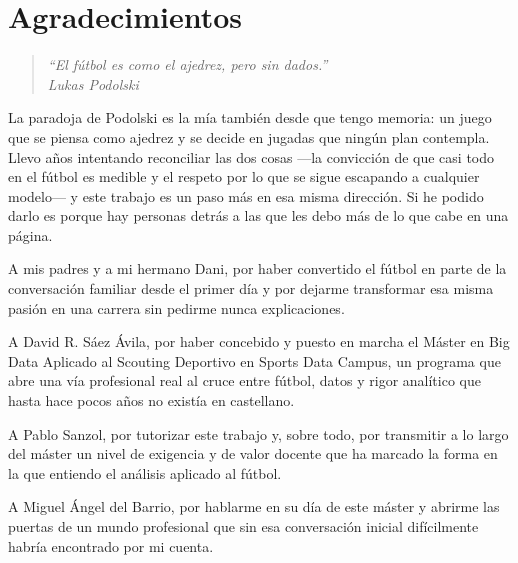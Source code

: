 \chapter*{Agradecimientos}

\begin{quote}
\itshape ``El fútbol es como el ajedrez, pero sin dados.''\\
\normalfont\textemdash{} Lukas Podolski
\end{quote}

\noindent
La paradoja de Podolski es la mía también desde que tengo memoria: un
juego que se piensa como ajedrez y se decide en jugadas que ningún
plan contempla. Llevo años intentando reconciliar las dos cosas
---la convicción de que casi todo en el fútbol es medible y el
respeto por lo que se sigue escapando a cualquier modelo--- y este
trabajo es un paso más en esa misma dirección. Si he podido darlo es
porque hay personas detrás a las que les debo más de lo que cabe en
una página.

A mis padres y a mi hermano Dani, por haber convertido el fútbol en
parte de la conversación familiar desde el primer día y por dejarme
transformar esa misma pasión en una carrera sin pedirme nunca
explicaciones.

A David R. Sáez Ávila, por haber concebido y puesto en marcha el
Máster en Big Data Aplicado al Scouting Deportivo en Sports Data
Campus, un programa que abre una vía profesional real al cruce entre
fútbol, datos y rigor analítico que hasta hace pocos años no existía
en castellano.

A Pablo Sanzol, por tutorizar este trabajo y, sobre todo, por
transmitir a lo largo del máster un nivel de exigencia y de valor
docente que ha marcado la forma en la que entiendo el análisis
aplicado al fútbol.

A Miguel Ángel del Barrio, por hablarme en su día de este máster y
abrirme las puertas de un mundo profesional que sin esa conversación
inicial difícilmente habría encontrado por mi cuenta.

\clearpage
